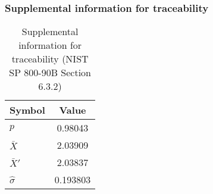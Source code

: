\documentclass[a3paper,xelatex,english]{bxjsarticle}
\begin{document}
\subsubsection{Supplemental information for traceability}
\renewcommand{\arraystretch}{1.8}
\begin{table}[h]
\caption{Supplemental information for traceability (NIST SP 800-90B Section 6.3.2)}
\begin{center}
\begin{tabular}{|l|c|}
\hline 
\rowcolor{anotherlightblue} %
Symbol				& Value \\ \hline 
$p$				&  0.98043\\ \hline 
$\bar{X}$ 		&  2.03909\\ \hline
$\bar{X}'$		&  2.03837\\ \hline
$\hat{\sigma}$		& 0.193803\\ \hline
\end{tabular}
\end{center}
\end{table}
\renewcommand{\arraystretch}{1.4}
\clearpage
\end{document}
